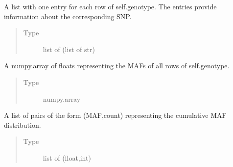 \documentclass[a4paper,10pt,english]{sphinxhowto}
\begin{document}
\begin{fulllineitems}
\begin{fulllineitems}
\begin{quote}
\begin{description}
\end{description}\end{quote}

\end{fulllineitems}


\begin{fulllineitems}
\label{\detokenize{utils:utils.genotype_corpus_merger.GenotypeCorpusMerger.snps}}
A list with one entry for each row of self.genotype. The entries provide information
about the corresponding SNP.
\begin{quote}\begin{description}
\item[{Type}] \leavevmode
list of (list of str)

\end{description}\end{quote}

\end{fulllineitems}


\begin{fulllineitems}
\label{\detokenize{utils:utils.genotype_corpus_merger.GenotypeCorpusMerger.mafs}}
A numpy.array of floats representing the MAFs of all rows of self.genotype.
\begin{quote}\begin{description}
\item[{Type}] \leavevmode
numpy.array

\end{description}\end{quote}

\end{fulllineitems}


\begin{fulllineitems}
\label{\detokenize{utils:utils.genotype_corpus_merger.GenotypeCorpusMerger.cum_mafs}}
A list of pairs of the form (MAF,count) representing the cumulative MAF distribution.
\begin{quote}\begin{description}
\item[{Type}] \leavevmode
list of (float,int)


\end{description}
\end{quote}
\end{fulllineitems}
\end{fulllineitems}
\end{document}

